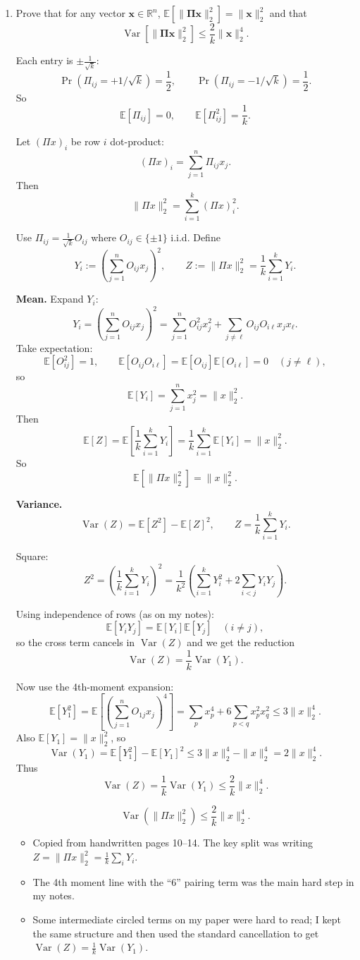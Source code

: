 \documentclass[10pt]{article}
\newcommand{\spara}[1]{\vspace{.5em}\noindent {\large\sffamily\textcolor{nyuOfficialPurple}{#1}}}
\newcommand{\R}{\mathbb{R}}
\newcommand{\E}{\mathbb{E}}
\DeclareMathOperator{\Var}{Var}
\newcommand{\bs}[1]{\boldsymbol{#1}}
\newcommand{\bv}[1]{\mathbf{#1}}
\begin{document}
\begin{enumerate}[label=\arabic*.]

\item Prove that for any vector $\bv{x}\in \R^n$, $\E[\|\bs{\Pi}\bv{x}\|_2^2] = \|\bv{x}\|_2^2$ and that
\[
\Var\!\left[\|\bs{\Pi}\bv{x}\|_2^2\right] \leq \frac{2}{k}\|\bv{x}\|_2^4.
\]

\spara{Pr. 5.1}

Each entry is $\pm \frac{1}{\sqrt{k}}$:
\[
\Pr(\Pi_{ij}=+1/\sqrt{k})=\frac{1}{2},
\qquad
\Pr(\Pi_{ij}=-1/\sqrt{k})=\frac{1}{2}.
\]
So
\[
\E[\Pi_{ij}]=0,
\qquad
\E[\Pi_{ij}^2]=\frac{1}{k}.
\]

Let $(\Pi x)_i$ be row $i$ dot-product:
\[
(\Pi x)_i=\sum_{j=1}^n \Pi_{ij}x_j.
\]
Then
\[
\|\Pi x\|_2^2=\sum_{i=1}^k (\Pi x)_i^2.
\]

Use $\Pi_{ij}=\frac{1}{\sqrt{k}}O_{ij}$ where $O_{ij}\in\{\pm 1\}$ i.i.d.
Define
\[
Y_i := \left(\sum_{j=1}^n O_{ij}x_j\right)^2,
\qquad
Z:=\|\Pi x\|_2^2=\frac{1}{k}\sum_{i=1}^k Y_i.
\]

\textbf{Mean.}
Expand $Y_i$:
\[
Y_i
=
\left(\sum_{j=1}^n O_{ij}x_j\right)^2
=
\sum_{j=1}^n O_{ij}^2 x_j^2
+
\sum_{j\ne \ell}O_{ij}O_{i\ell}x_jx_\ell.
\]
Take expectation:
\[
\E[O_{ij}^2]=1,
\qquad
\E[O_{ij}O_{i\ell}]=\E[O_{ij}]\E[O_{i\ell}]=0\quad (j\ne \ell),
\]
so
\[
\E[Y_i]=\sum_{j=1}^n x_j^2=\|x\|_2^2.
\]
Then
\[
\E[Z]=\E\!\left[\frac{1}{k}\sum_{i=1}^k Y_i\right]
=
\frac{1}{k}\sum_{i=1}^k \E[Y_i]
=
\|x\|_2^2.
\]
So
\[
\boxed{\E[\|\Pi x\|_2^2]=\|x\|_2^2.}
\]

\textbf{Variance.}
\[
\Var(Z)=\E[Z^2]-\E[Z]^2,
\qquad
Z=\frac{1}{k}\sum_{i=1}^k Y_i.
\]

Square:
\[
Z^2
=
\left(\frac{1}{k}\sum_{i=1}^k Y_i\right)^2
=
\frac{1}{k^2}\left(\sum_{i=1}^k Y_i^2 + 2\sum_{i<j}Y_iY_j\right).
\]

Using independence of rows (as on my notes):
\[
\E[Y_iY_j]=\E[Y_i]\E[Y_j]\quad (i\ne j),
\]
so the cross term cancels in $\Var(Z)$ and we get the reduction
\[
\Var(Z)=\frac{1}{k}\Var(Y_1).
\]

Now use the 4th-moment expansion:
\[
\E[Y_1^2]
=
\E\!\left[\left(\sum_{j=1}^n O_{1j}x_j\right)^4\right]
=
\sum_p x_p^4 + 6\sum_{p<q}x_p^2x_q^2
\le 3\|x\|_2^4.
\]
Also $\E[Y_1]=\|x\|_2^2$, so
\[
\Var(Y_1)=\E[Y_1^2]-\E[Y_1]^2 \le 3\|x\|_2^4-\|x\|_2^4=2\|x\|_2^4.
\]
Thus
\[
\Var(Z)=\frac{1}{k}\Var(Y_1)\le \frac{2}{k}\|x\|_2^4.
\]

\[
\boxed{\Var(\|\Pi x\|_2^2)\le \frac{2}{k}\|x\|_2^4.}
\]

\spara{Notes (Pr. 5.1)}
\begin{itemize}
\item Copied from handwritten pages 10--14. The key split was writing $Z=\|\Pi x\|_2^2=\frac{1}{k}\sum_i Y_i$.
\item The 4th moment line with the ``$6$'' pairing term was the main hard step in my notes.
\item Some intermediate circled terms on my paper were hard to read; I kept the same structure and then used the standard cancellation to get $\Var(Z)=\frac{1}{k}\Var(Y_1)$.
\end{itemize}



\end{enumerate}
\end{document}
